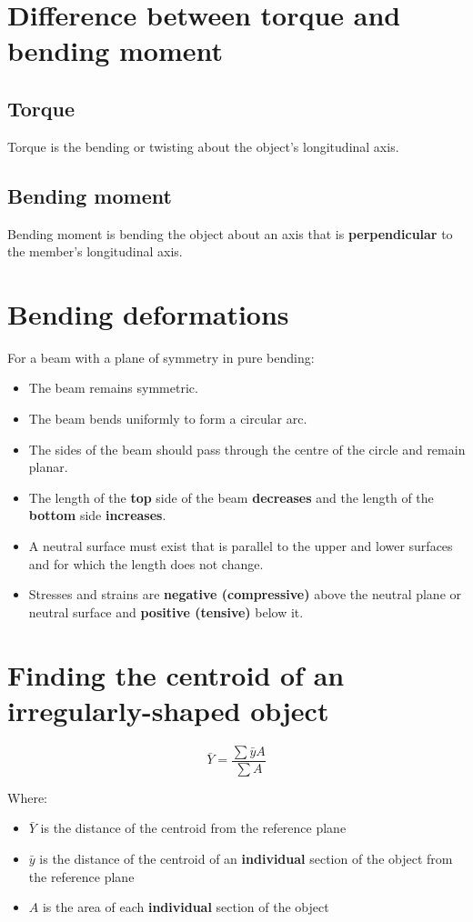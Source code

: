 \documentclass[11pt]{article}
\begin{document}
\newpage

\section{Difference between torque and bending moment}
\label{sec:org5888cb1}

\subsection{Torque}
\label{sec:orgd4944e3}
Torque is the bending or twisting about the object's longitudinal axis.

\subsection{Bending moment}
\label{sec:org84e4b8b}
Bending moment is bending the object about an axis that is \textbf{perpendicular} to the member's longitudinal axis.


\section{Bending deformations}
\label{sec:orgb991b69}
For a beam with a plane of symmetry in pure bending:
\begin{itemize}
\item The beam remains symmetric.
\item The beam bends uniformly to form a circular arc.
\item The sides of the beam should pass through the centre of the circle and remain planar.
\item The length of the \textbf{top} side of the beam \textbf{decreases} and the length of the \textbf{bottom} side \textbf{increases}.
\item A neutral surface must exist that is parallel to the upper and lower surfaces and for which the length does not change.
\item Stresses and strains are \textbf{negative (compressive)} above the neutral plane or neutral surface and \textbf{positive (tensive)} below it.
\end{itemize}


\section{Finding the centroid of an irregularly-shaped object}
\label{sec:orga065442}
\[\bar{Y} = \frac{\sum \bar{y} A}{\sum A}\]

Where:
\begin{itemize}
\item \(\bar{Y}\) is the distance of the centroid from the reference plane
\item \(\bar{y}\) is the distance of the centroid of an \textbf{individual} section of the object from the reference plane
\item \(A\) is the area of each \textbf{individual} section of the object
\end{itemize}
\end{document}
